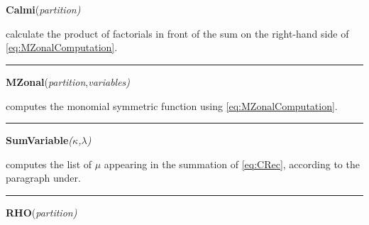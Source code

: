 \documentclass[10pt,oneside,american]{amsart}
\numberwithin{equation}{section}
\numberwithin{figure}{section}
\theoremstyle{definition}
\theoremstyle{remark}
\theoremstyle{plain}
\theoremstyle{definition}
\theoremstyle{plain}
\theoremstyle{plain}
\theoremstyle{plain}
\begin{document}
~\\
~
\noindent \begin{flushleft}
\textbf{Calmi}(\emph{partition)}
\par\end{flushleft}

\noindent \begin{flushleft}
calculate the product of factorials in front of the sum on the right-hand
side of \eqref{eq:MZonalComputation}.
\par\end{flushleft}

\noindent \begin{flushleft}
\rule[0.5ex]{1\columnwidth}{1pt}
\par\end{flushleft}

\noindent \begin{flushleft}
\textbf{MZonal}(\emph{partition},\emph{variables)}
\par\end{flushleft}

\noindent \begin{flushleft}
computes the monomial symmetric function using \eqref{eq:MZonalComputation}.
\par\end{flushleft}

\noindent \begin{flushleft}
\rule[0.5ex]{1\columnwidth}{1pt}
\par\end{flushleft}

\noindent \begin{flushleft}
\textbf{SumVariable}\emph{($\kappa$,$\lambda$)}
\par\end{flushleft}

\noindent \begin{flushleft}
computes the list of $\mu$ appearing in the summation of \eqref{eq:CRec},
according to the paragraph under.
\par\end{flushleft}

\noindent \begin{flushleft}
\rule[0.5ex]{1\columnwidth}{1pt}
\par\end{flushleft}

\noindent \begin{flushleft}
\textbf{RHO}(\emph{partition)}
\par\end{flushleft}
\end{document}
